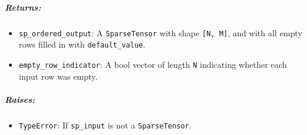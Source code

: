 \subparagraph{Returns: }\label{returns-9}

\begin{itemize}
\tightlist
\item
  \texttt{sp\_ordered\_output}: A \texttt{SparseTensor} with shape
  \texttt{{[}N,\ M{]}}, and with all empty rows filled in with
  \texttt{default\_value}.
\item
  \texttt{empty\_row\_indicator}: A bool vector of length \texttt{N}
  indicating whether each input row was empty.
\end{itemize}

\subparagraph{Raises: }\label{raises-5}

\begin{itemize}
\tightlist
\item
  \texttt{TypeError}: If \texttt{sp\_input} is not a
  \texttt{SparseTensor}.
\end{itemize}

